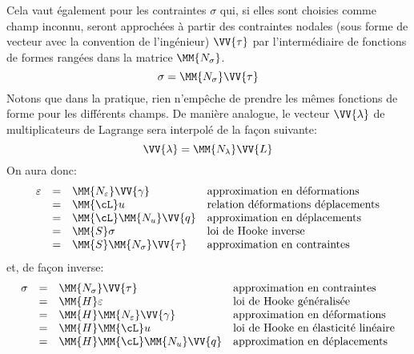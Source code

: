 Cela vaut également pour les contraintes $\sigma$ qui, si elles sont choisies comme champ
inconnu, seront approchées à partir des contraintes nodales (sous forme de vecteur avec
la convention de l'ingénieur) $\VV{\tau}$ par l'intermédiaire de fonctions de formes rangées
dans la matrice $\MM{N_\sigma}$.
\begin{equation}
   \sigma = \MM{N_\sigma}\VV{\tau}
\end{equation}
Notons que dans la pratique, rien n'empêche de prendre les mêmes fonctions
de forme pour les différents champs.
\medskip
De manière analogue, le vecteur $\VV{\lambda}$ de multiplicateurs
de Lagrange sera interpolé de la fa\c{c}on suivante:
\begin{equation}
   \VV{\lambda}=\MM{N_\lambda}\VV{L}
\end{equation}
\medskip
On aura donc:
\begin{equation}
   \begin{array}{rcll}
   \varepsilon &=& \MM{N_\varepsilon}\VV{\gamma}
                      &\text{approximation en déformations}\\
                    &=& \MM{\cL}u
                      &\text{relation déformations déplacements}\\
                    &=& \MM{\cL}\MM{N_u}\VV{q}
                      &\text{approximation en déplacements}\\
                    &=& \MM{S}\sigma
                      &\text{loi de Hooke inverse}\\
                    &=& \MM{S}\MM{N_\sigma}\VV{\tau}
                      &\text{approximation en contraintes}
   \end{array}
\end{equation}
et, de fa\c{c}on inverse:
\begin{equation}
   \begin{array}{rcll}
   \sigma &=& \MM{N_\sigma}\VV{\tau}
                      &\text{approximation en contraintes}\\
                    &=& \MM{H}\varepsilon
                      &\text{loi de Hooke généralisée}\\
                    &=& \MM{H}\MM{N_\varepsilon}\VV{\gamma}
                      &\text{approximation en déformations}\\
                    &=& \MM{H}\MM{\cL}u
                      &\text{loi de Hooke en élasticité linéaire}\\
                    &=& \MM{H}\MM{\cL}\MM{N_u}\VV{q}
                      &\text{approximation en déplacements}
   \end{array}
\end{equation}
